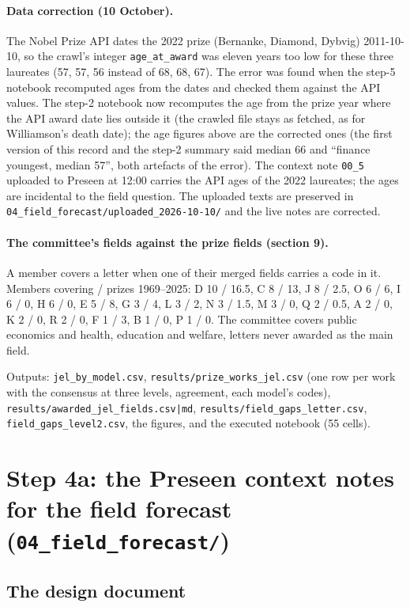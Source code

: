 \documentclass[11pt,a4paper]{article}
\newcommand{\code}[1]{\texttt{#1}}
\begin{document}
\paragraph{Data correction (10 October).} The Nobel Prize API dates the 2022 prize (Bernanke, Diamond, Dybvig)
2011-10-10, so the crawl's integer \code{age\_at\_award} was eleven years too low for these three laureates (57, 57,
56 instead of 68, 68, 67). The error was found when the step-5 notebook recomputed ages from the dates and checked them
against the API values. The step-2 notebook now recomputes the age from the prize year where the API award date lies
outside it (the crawled file stays as fetched, as for Williamson's death date); the age figures above are the corrected
ones (the first version of this record and the step-2 summary said median 66 and ``finance youngest, median 57'',
both artefacts of the error). The context note \code{00\_5} uploaded to Preseen at 12:00 carries the API ages of the
2022 laureates; the ages are incidental to the field question. The uploaded texts are preserved in
\code{04\_field\_forecast/uploaded\_2026-10-10/} and the live notes are corrected.

\paragraph{The committee's fields against the prize fields (section 9).} A member covers a letter when one of their
merged fields carries a code in it. Members covering / prizes 1969--2025: D 10 / 16.5, C 8 / 13, J 8 / 2.5, O 6 / 6,
I 6 / 0, H 6 / 0, E 5 / 8, G 3 / 4, L 3 / 2, N 3 / 1.5, M 3 / 0, Q 2 / 0.5, A 2 / 0, K 2 / 0, R 2 / 0, F 1 / 3,
B 1 / 0, P 1 / 0. The committee covers public economics and health, education and welfare, letters never awarded as
the main field.

Outputs: \code{jel\_by\_model.csv}, \code{results/prize\_works\_jel.csv} (one row per work with the consensus at
three levels, agreement, each model's codes), \code{results/awarded\_jel\_fields.csv|md},
\code{results/field\_gaps\_letter.csv}, \code{field\_gaps\_level2.csv}, the figures, and the executed notebook
(55 cells).

\section{Step 4a: the Preseen context notes for the field forecast (\code{04\_field\_forecast/})}

\subsection{The design document}
\end{document}
